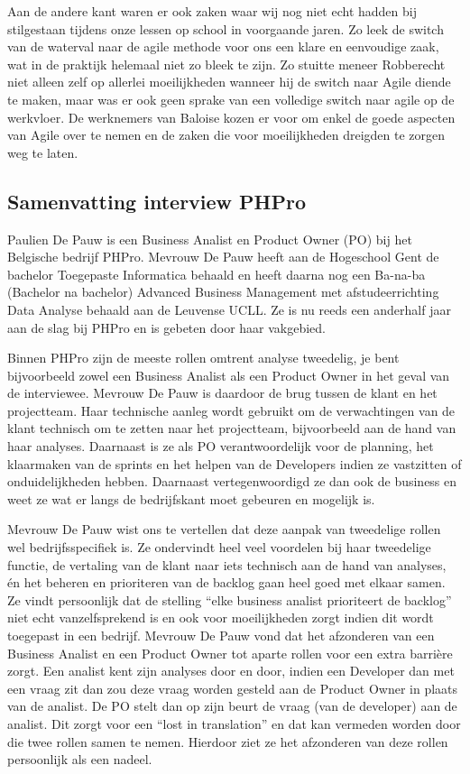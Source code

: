 \documentclass{hogent-article}
\begin{document}
Aan de andere kant waren er ook zaken waar wij nog niet echt hadden bij stilgestaan tijdens onze lessen op school in voorgaande jaren. Zo leek de switch van de waterval naar de agile methode voor ons een klare en eenvoudige zaak, wat in de praktijk helemaal niet zo bleek te zijn. Zo stuitte meneer Robberecht niet alleen zelf op allerlei moeilijkheden wanneer hij de switch naar Agile diende te maken, maar was er ook geen sprake van een volledige switch naar agile op de werkvloer. De werknemers van Baloise kozen er voor om enkel de goede aspecten van Agile over te nemen en de zaken die voor moeilijkheden dreigden te zorgen weg te laten.

\subsection{ Samenvatting interview PHPro}

Paulien De Pauw is een Business Analist en Product Owner (PO) bij het Belgische bedrijf PHPro. Mevrouw De Pauw heeft aan de Hogeschool Gent de bachelor Toegepaste Informatica behaald en heeft daarna nog een Ba-na-ba  (Bachelor na bachelor) Advanced Business Management met afstudeerrichting Data Analyse behaald aan de Leuvense UCLL. Ze is nu reeds een anderhalf jaar aan de slag bij PHPro en is gebeten door haar vakgebied. 

Binnen PHPro zijn de meeste rollen omtrent analyse tweedelig, je bent bijvoorbeeld zowel een Business Analist als een Product Owner in het geval van de interviewee. Mevrouw De Pauw is daardoor de brug tussen de klant en het projectteam. Haar technische aanleg wordt gebruikt om de verwachtingen van de klant technisch om te zetten naar het projectteam, bijvoorbeeld aan de hand van haar analyses. Daarnaast is ze als PO verantwoordelijk voor de planning, het klaarmaken van de sprints en het helpen van de Developers indien ze vastzitten of onduidelijkheden hebben. Daarnaast vertegenwoordigd ze dan ook de business en weet ze wat er langs de bedrijfskant moet gebeuren en mogelijk is.

Mevrouw De Pauw wist ons te vertellen dat deze aanpak van tweedelige rollen wel bedrijfsspecifiek is. Ze ondervindt heel veel voordelen bij haar tweedelige functie, de vertaling van de klant naar iets technisch aan de hand van analyses, én het beheren en prioriteren van de backlog gaan heel goed met elkaar samen. Ze vindt persoonlijk dat de stelling “elke business analist prioriteert de backlog” niet echt vanzelfsprekend is en ook voor moeilijkheden zorgt indien dit wordt toegepast in een bedrijf. Mevrouw De Pauw vond dat het afzonderen van een Business Analist en een Product Owner tot aparte rollen voor een extra barrière zorgt. Een analist kent zijn analyses door en door, indien een Developer dan met een vraag zit dan zou deze vraag worden gesteld aan de Product Owner in plaats van de analist. De PO stelt dan op zijn beurt de vraag (van de developer) aan de analist. Dit zorgt voor een “lost in translation” en dat kan vermeden worden door die twee rollen samen te nemen. Hierdoor ziet ze het afzonderen van deze rollen persoonlijk als een nadeel.
\end{document}
